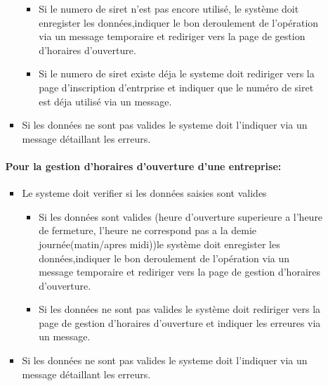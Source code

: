 \documentclass{article}
\begin{document}
\begin{itemize}
\begin{itemize}
\begin{itemize}
		\begin{itemize}
		\item Si le numero de siret n'est pas encore utilisé, le système
			doit enregister les données,indiquer le bon deroulement de l'opération via un message temporaire et rediriger vers la page de gestion d'horaires d'ouverture.
		\item Si le numero de siret existe déja le systeme doit rediriger vers
			la page d'inscription d'entrprise et indiquer que le numéro de siret est déja utilisé
			via un message.
		\end{itemize}

\item Si les données ne sont pas valides le systeme doit l'indiquer
	via un message détaillant les erreurs.
\end{itemize}

\paragraph{Pour la gestion d'horaires d'ouverture d'une entreprise: }
\begin{itemize}
\item Le systeme doit verifier si les données saisies sont valides
	
		\begin{itemize}
		\item Si les données sont valides (heure d'ouverture superieure a l'heure de fermeture, l'heure ne correspond pas a la demie journée(matin/apres midi))le système
			doit enregister les données,indiquer le bon deroulement de l'opération via un message temporaire et rediriger vers la page de gestion d'horaires d'ouverture.
		\item Si les données ne sont pas valides le système doit rediriger vers
			la page de gestion d'horaires d'ouverture et indiquer les erreures
			via un message.
		\end{itemize}

\item Si les données ne sont pas valides le systeme doit l'indiquer
	via un message détaillant les erreurs.
\end{itemize}


\end{itemize}
\end{itemize}
\end{document}

